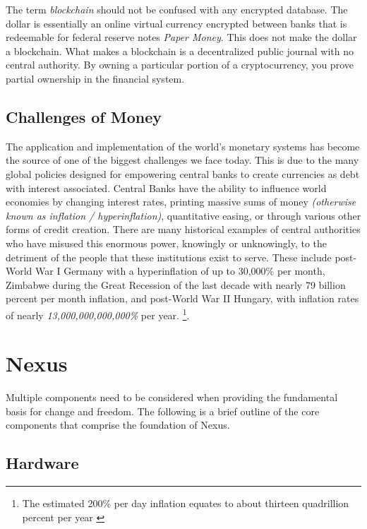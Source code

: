 \documentclass[11pt]{article}
\begin{document}
\noindent
The term \textit{blockchain} should not be confused with any encrypted database. The dollar is essentially an online virtual currency encrypted between banks that is redeemable for federal reserve notes \textit{Paper Money}. This does not make the dollar a blockchain. What makes a blockchain is a decentralized public journal with no central authority. 
By owning a particular portion of a cryptocurrency, you prove partial ownership in the financial system.

\subsection{Challenges of Money}

The application and implementation of the world's monetary systems has become the source of one of the biggest challenges we face today.
This is due to the many global policies designed for empowering central banks to create currencies as debt with interest associated. 
Central Banks have the ability to influence world economies by changing interest rates, printing massive sums of money \textit{(otherwise known as inflation / hyperinflation)}, quantitative easing, or through various other forms of credit creation.
There are many historical examples of central authorities who have misused this enormous power, knowingly or unknowingly, to the detriment of the people that these institutions exist to serve. 
These include post-World War I Germany with a hyperinflation of up to 30,000\% per month, Zimbabwe during the Great Recession of the last decade with nearly 79 billion percent per month inflation, and post-World War II Hungary, with inflation rates of nearly \textit{13,000,000,000,000\%} per year.  \footnote{The estimated 200\% per day inflation equates to about thirteen quadrillion percent per year \cite{hyperinflation}}.


\section{Nexus}

Multiple components need to be considered when providing the fundamental basis for change and freedom.
The following is a brief outline of the core components that comprise the foundation of Nexus.

\subsection{Hardware}
\end{document}
